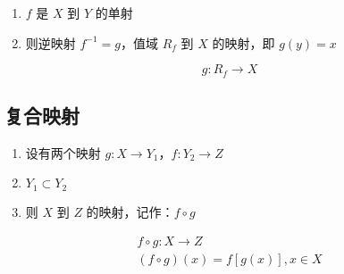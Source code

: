 \begin{enumerate}
  \item $f$ 是 $X$ 到 $Y$ 的单射
  \item 则逆映射 $f^{-1} = g$，值域 $R_f$ 到 $X$ 的映射，即 $g(y) = x$
\end{enumerate}

\begin{equation}
g:R_f \to X
\end{equation}

\subsection{复合映射}

\begin{enumerate}
  \item 设有两个映射 $g:X \to Y_1$，$f:Y_2 \to Z$
  \item $Y_1 \subset Y_2$
  \item 则 $X$ 到 $Z$ 的映射，记作：$f \circ g$
\end{enumerate}

\begin{gather}
f \circ g: X \to Z \\
(f \circ g)(x) = f[g(x)], x \in X
\end{gather}
